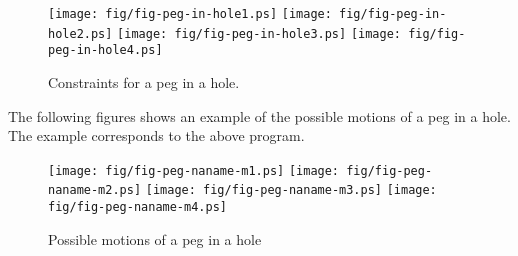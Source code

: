 \begin{figure}[h]
\texttt{[image: fig/fig-peg-in-hole1.ps]}
\texttt{[image: fig/fig-peg-in-hole2.ps]}
\texttt{[image: fig/fig-peg-in-hole3.ps]}
\texttt{[image: fig/fig-peg-in-hole4.ps]}
\caption{Constraints for a peg in a hole.}
\label{fig:peg-in-hole}
\end{figure}

\clearpage

The following figures shows an example of the possible motions
of a peg in a hole.
The example corresponds to the above program.\\

\begin{figure}[h]
\begin{center}
\texttt{[image: fig/fig-peg-naname-m1.ps]}
\texttt{[image: fig/fig-peg-naname-m2.ps]}
\texttt{[image: fig/fig-peg-naname-m3.ps]}
\texttt{[image: fig/fig-peg-naname-m4.ps]}
\end{center}
\caption{Possible motions of a peg in a hole}
\label{fig:peg-in-a-hole}
\end{figure}

\clearpage
